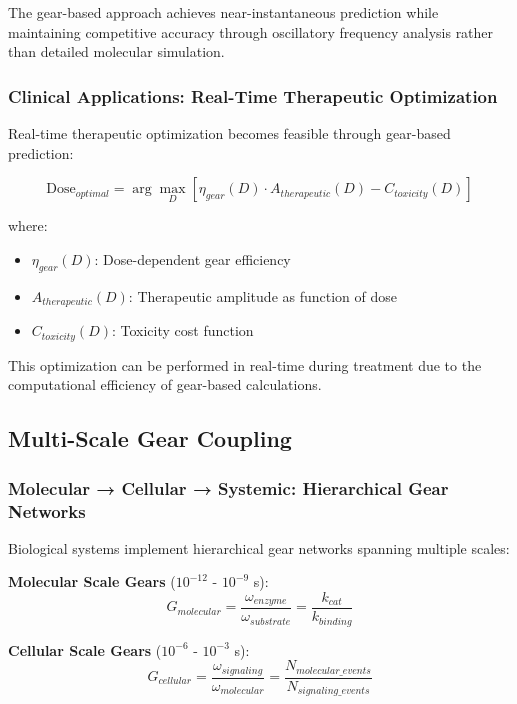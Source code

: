 \documentclass[12pt,a4paper]{article}
\begin{document}
The gear-based approach achieves near-instantaneous prediction while maintaining competitive accuracy through oscillatory frequency analysis rather than detailed molecular simulation.

\subsubsection{Clinical Applications: Real-Time Therapeutic Optimization}

Real-time therapeutic optimization becomes feasible through gear-based prediction:

\begin{equation}
\text{Dose}_{optimal} = \arg\max_{D} \left[\eta_{gear}(D) \cdot A_{therapeutic}(D) - C_{toxicity}(D)\right]
\end{equation}

where:
\begin{itemize}
\item $\eta_{gear}(D)$: Dose-dependent gear efficiency
\item $A_{therapeutic}(D)$: Therapeutic amplitude as function of dose
\item $C_{toxicity}(D)$: Toxicity cost function
\end{itemize}

This optimization can be performed in real-time during treatment due to the computational efficiency of gear-based calculations.

\subsection{Multi-Scale Gear Coupling}

\subsubsection{Molecular → Cellular → Systemic: Hierarchical Gear Networks}

Biological systems implement hierarchical gear networks spanning multiple scales:

\textbf{Molecular Scale Gears} ($10^{-12}$ - $10^{-9}$ s):
\begin{equation}
G_{molecular} = \frac{\omega_{enzyme}}{\omega_{substrate}} = \frac{k_{cat}}{k_{binding}}
\end{equation}

\textbf{Cellular Scale Gears} ($10^{-6}$ - $10^{-3}$ s):
\begin{equation}
G_{cellular} = \frac{\omega_{signaling}}{\omega_{molecular}} = \frac{N_{molecular\_events}}{N_{signaling\_events}}
\end{equation}
\end{document}
